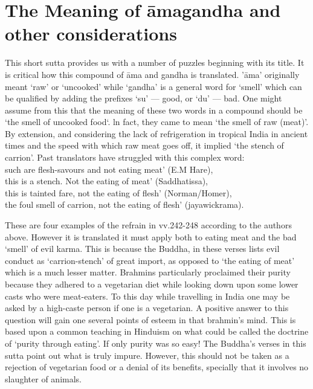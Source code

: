\section{The Meaning of \=amagandha and other considerations}
This short sutta provides us with a number of puzzles beginning with its title. It is critical how this compound of \=ama and gandha is translated. '\=ama' originally meant `raw' or `uncooked' while `gandha' is a general word for `smell' which can be qualiﬁed by adding the preﬁxes `su' — good, or `du' — bad. One might assume from this that the meaning of these two words in a compound should be `the smell of uncooked food`. ln fact, they came to mean `the smell of raw (meat)'. By extension, and considering the lack of refrigeration in tropical India in ancient times and the speed with which raw meat goes off, it implied `the stench of carrion'.
Past translators have struggled with this complex word:\\
\newline
such are ﬂesh-savours and not eating meat' (E.M Hare),\\
\newline
this is a stench. Not the eating of meat' (Saddhatissa),\\
\newline
this is tainted fare, not the eating of ﬂesh' (Norman/Homer),\\
\newline
the foul smell of carrion, not the eating of ﬂesh' (jayawickrama).\\
\newline
   
These are four examples of the refrain in vv.242-248 according to the authors above. However it is translated it must apply both to eating meat and the bad `smell' of evil karma. This is because the Buddha, in these verses lists evil conduct as `carrion-stench' of great import, as opposed to `the eating of meat' which is a much lesser matter. Brahmins particularly proclaimed their purity because they adhered to a vegetarian diet while looking down upon some lower casts who were meat-eaters. To this day while travelling in India one may be asked by a high-caste person if one is a vegetarian. A positive answer to this question will gain one several points of esteem in that brahmin's mind. This is based upon a common teaching in Hinduism on what could be called the doctrine of `purity through eating'. If only purity was so easy! The Buddha's verses in this sutta point out  what is truly impure. However, this should not be taken as a rejection of vegetarian food or a denial of its benefits, specially that it involves no slaughter of animals.\\

